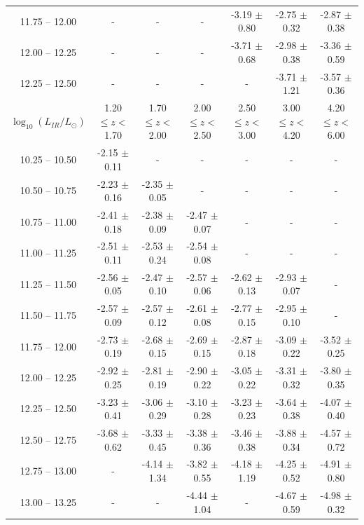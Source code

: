 \begin{landscape}
\begin{table}
\begin{center}
\begin{tabular}{@{}ccccccc@{}}
        11.75 -- 12.00 & -                & -                & -                & -3.19 $\pm$ 0.80 & -2.75 $\pm$ 0.32 & -2.87 $\pm$ 0.38 \\
        12.00 -- 12.25 & -                & -                & -                & -3.71 $\pm$ 0.68 & -2.98 $\pm$ 0.38 & -3.36 $\pm$ 0.59 \\
        12.25 -- 12.50 & -                & -                & -                & -                & -3.71 $\pm$ 1.21 & -3.57 $\pm$ 0.36 \\
        \hline
        $\log_{10}(L_{IR}/L_{\odot})$ & 1.20 $\leq z <$ 1.70 & 1.70 $\leq z <$ 2.00 & 2.00 $\leq z <$ 2.50 & 2.50 $\leq z <$ 3.00 & 3.00 $\leq z <$ 4.20 & 4.20 $\leq z <$ 6.00  \\
        \hline
        10.25 -- 10.50 & -2.15 $\pm$ 0.11 & - & - & - & - & - \\
        10.50 -- 10.75 & -2.23 $\pm$ 0.16 & -2.35 $\pm$ 0.05 & - & - & - & - \\
        10.75 -- 11.00 & -2.41 $\pm$ 0.18 & -2.38 $\pm$ 0.09 & -2.47 $\pm$ 0.07 & - & - & - \\
        11.00 -- 11.25 & -2.51 $\pm$ 0.11 & -2.53 $\pm$ 0.24 & -2.54 $\pm$ 0.08 & - & - & - \\
        11.25 -- 11.50 & -2.56 $\pm$ 0.05 & -2.47 $\pm$ 0.10 & -2.57 $\pm$ 0.06 & -2.62 $\pm$ 0.13 & -2.93 $\pm$ 0.07 & - \\
        11.50 -- 11.75 & -2.57 $\pm$ 0.09 & -2.57 $\pm$ 0.12 & -2.61 $\pm$ 0.08 & -2.77 $\pm$ 0.15 & -2.95 $\pm$ 0.10 & - \\
        11.75 -- 12.00 & -2.73 $\pm$ 0.19 & -2.68 $\pm$ 0.15 & -2.69 $\pm$ 0.15 & -2.87 $\pm$ 0.18 & -3.09 $\pm$ 0.22 & -3.52 $\pm$ 0.25 \\
        12.00 -- 12.25 & -2.92 $\pm$ 0.25 & -2.81 $\pm$ 0.19 & -2.90 $\pm$ 0.22 & -3.05 $\pm$ 0.22 & -3.31 $\pm$ 0.32 & -3.80 $\pm$ 0.35 \\
        12.25 -- 12.50 & -3.23 $\pm$ 0.41 & -3.06 $\pm$ 0.29 & -3.10 $\pm$ 0.28 & -3.23 $\pm$ 0.23 & -3.64 $\pm$ 0.38 & -4.07 $\pm$ 0.40 \\
        12.50 -- 12.75 & -3.68 $\pm$ 0.62 & -3.33 $\pm$ 0.45 & -3.38 $\pm$ 0.36 & -3.46 $\pm$ 0.38 & -3.88 $\pm$ 0.34 & -4.57 $\pm$ 0.72 \\
        12.75 -- 13.00 & -                & -4.14 $\pm$ 1.34 & -3.82 $\pm$ 0.55 & -4.18 $\pm$ 1.19 & -4.25 $\pm$ 0.52 & -4.91 $\pm$ 0.80 \\
        13.00 -- 13.25 & -                & -                & -4.44 $\pm$ 1.04 & -                & -4.67 $\pm$ 0.59 & -4.98 $\pm$ 0.32 \\
        \bottomrule
    \end{tabular}
    \end{center}
    \end{table}
\end{landscape}


